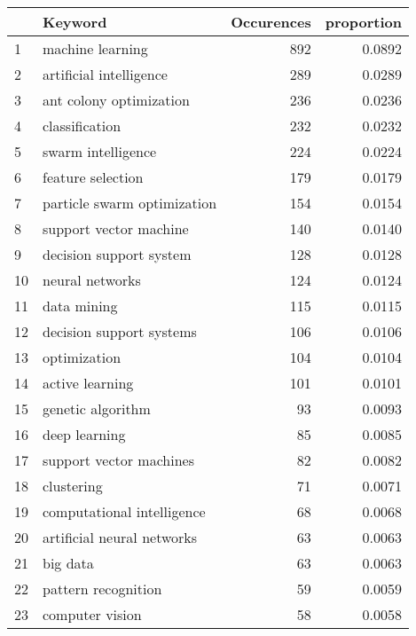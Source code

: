 \begin{tabular}{llrr}
\toprule
{} &                          Keyword &  Occurences &  proportion \\
\midrule
1  &                 machine learning &         892 &      0.0892 \\
2  &          artificial intelligence &         289 &      0.0289 \\
3  &          ant colony optimization &         236 &      0.0236 \\
4  &                   classification &         232 &      0.0232 \\
5  &               swarm intelligence &         224 &      0.0224 \\
6  &                feature selection &         179 &      0.0179 \\
7  &      particle swarm optimization &         154 &      0.0154 \\
8  &           support vector machine &         140 &      0.0140 \\
9  &          decision support system &         128 &      0.0128 \\
10 &                  neural networks &         124 &      0.0124 \\
11 &                      data mining &         115 &      0.0115 \\
12 &         decision support systems &         106 &      0.0106 \\
13 &                     optimization &         104 &      0.0104 \\
14 &                  active learning &         101 &      0.0101 \\
15 &                genetic algorithm &          93 &      0.0093 \\
16 &                    deep learning &          85 &      0.0085 \\
17 &          support vector machines &          82 &      0.0082 \\
18 &                       clustering &          71 &      0.0071 \\
19 &       computational intelligence &          68 &      0.0068 \\
20 &       artificial neural networks &          63 &      0.0063 \\
21 &                         big data &          63 &      0.0063 \\
22 &              pattern recognition &          59 &      0.0059 \\
23 &                  computer vision &          58 &      0.0058 \\

\end{tabular}
